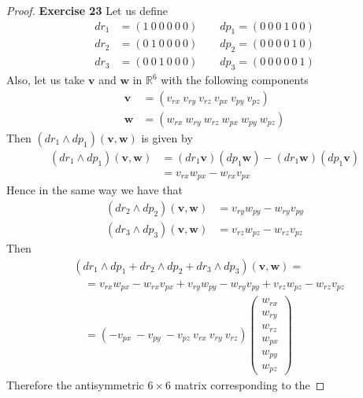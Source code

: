 \documentclass[11pt]{article}
\newcommand{\R}{\mathbb{R}}
\theoremstyle{definition}
\begin{document}
\begin{proof}{\textbf{Exercise 23}}
    Let us define
    \begin{align*}
        dr_1 &= (1 ~ 0 ~ 0 ~ 0 ~ 0 ~ 0)
        \qquad dp_1 = (0 ~ 0 ~ 0 ~ 1 ~ 0 ~ 0)\\
        dr_2 &= (0 ~ 1 ~ 0 ~ 0 ~ 0 ~ 0)
        \qquad dp_2 = (0 ~ 0 ~ 0 ~ 0 ~ 1 ~ 0)\\
        dr_3 &= (0 ~ 0 ~ 1 ~ 0 ~ 0 ~ 0)
        \qquad dp_3 = (0 ~ 0 ~ 0 ~ 0 ~ 0 ~ 1)
    \end{align*}
    Also, let us take $\bm{v}$ and $\bm{w}$ in $\R^6$ with the following
    components
    \begin{align*}
        \bm{v} &= (v_{rx}~v_{ry}~v_{rz}~v_{px}~v_{py}~v_{pz})\\
        \bm{w} &= (w_{rx} ~ w_{ry} ~ w_{rz} ~ w_{px} ~ w_{py} ~ w_{pz})
    \end{align*}
    Then $(dr_1 \wedge dp_1)(\bm{v}, \bm{w})$ is given by
    \begin{align*}
        (dr_1 \wedge dp_1)(\bm{v}, \bm{w})
        &= (dr_1\bm{v})(dp_1\bm{w}) - (dr_1\bm{w})(dp_1\bm{v})\\
        &= v_{rx}w_{px} - w_{rx}v_{px}
    \end{align*}
    Hence in the same way we have that
    \begin{align*}
        (dr_2 \wedge dp_2)(\bm{v}, \bm{w}) &= v_{ry}w_{py} - w_{ry}v_{py}\\
        (dr_3 \wedge dp_3)(\bm{v}, \bm{w}) &= v_{rz}w_{pz} - w_{rz}v_{pz}
    \end{align*}
    Then
    \begin{align*}
        &(dr_1 \wedge dp_1 + dr_2 \wedge dp_2 + dr_3 \wedge dp_3)
        (\bm{v}, \bm{w}) = \\
        &\quad = v_{rx}w_{px} - w_{rx}v_{px}
        + v_{ry}w_{py} - w_{ry}v_{py}
        + v_{rz}w_{pz} - w_{rz}v_{pz}\\
        &\quad = (-v_{px} ~ -v_{py} ~ -v_{pz} ~ v_{rx} ~ v_{ry} ~ v_{rz})
        \begin{pmatrix}
            w_{rx} \\ w_{ry} \\ w_{rz} \\ w_{px} \\ w_{py} \\ w_{pz}
        \end{pmatrix}
    \end{align*}
    Therefore the antisymmetric $6\times 6$ matrix corresponding to the

\end{proof}
\end{document}
